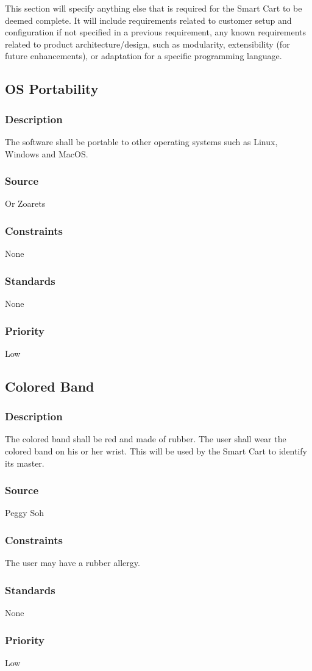 This section will specify anything else that is required for the Smart Cart to be deemed complete. It will include requirements related to customer setup and configuration if not specified in a previous requirement, any known requirements related to product architecture/design, such as modularity, extensibility (for future enhancements), or adaptation for a specific programming language.

\subsection{OS Portability}
\subsubsection{Description}
The software shall be portable to other operating systems such as Linux, Windows and MacOS. 
\subsubsection{Source}
Or Zoarets
\subsubsection{Constraints}
None
\subsubsection{Standards}
None
\subsubsection{Priority}
Low


\subsection{Colored Band}
\subsubsection{Description}
The colored band shall be red and made of rubber. The user shall wear the colored band on his or her wrist. This will be used by the Smart Cart to identify its master. 
\subsubsection{Source}
Peggy Soh
\subsubsection{Constraints}
The user may have a rubber allergy.
\subsubsection{Standards}
None
\subsubsection{Priority}
Low
